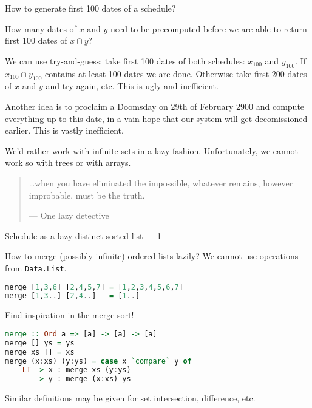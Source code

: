 \documentclass[handout]{beamer}
\begin{document}
\begin{frame}{How to generate first 100  dates of a schedule?}

How many dates of $x$ and $y$ need to be precomputed
before we are able to return first 100 dates of $x \cap y$?

\bigskip

\pause
We can use try-and-guess: take first 100 dates of both
schedules: $x_{100}$ and $y_{100}$.
If $x_{100} \cap y_{100}$ contains at least 100 dates
we are done. Otherwise take first 200 dates of $x$ and $y$
and try again, etc.
This is ugly and inefficient.

\bigskip

\pause
Another idea is to proclaim a Doomsday
on 29th of February 2900 and compute everything up to this date,
in a vain hope that our system will get decomissioned earlier.
This is vastly inefficient.

\bigskip

\pause
We'd rather work with infinite sets
in a lazy fashion. Unfortunately, we cannot work so with
trees or with arrays.

\pause
\begin{quote}
\ldots when you have eliminated the impossible, whatever remains, however improbable, must be the truth.

\flushright --- One lazy detective
\end{quote}

\end{frame}

\begin{frame}[fragile]{Schedule as a lazy distinct sorted list --- 1}

How to merge (possibly infinite) ordered lists lazily?
We cannot use operations from {\tt Data.List}.

\pause

\begin{lstlisting}[language=Haskell]
merge [1,3,6] [2,4,5,7] = [1,2,3,4,5,6,7]
merge [1,3..] [2,4..]   = [1..]
\end{lstlisting}

\pause
Find inspiration in the merge sort!

\pause
\begin{lstlisting}[language=Haskell]
merge :: Ord a => [a] -> [a] -> [a]
merge [] ys = ys
merge xs [] = xs
merge (x:xs) (y:ys) = case x `compare` y of
    LT -> x : merge xs (y:ys)
    _  -> y : merge (x:xs) ys
\end{lstlisting}

\pause
Similar definitions may be given for set intersection, difference, etc.

\end{frame}
\end{document}
